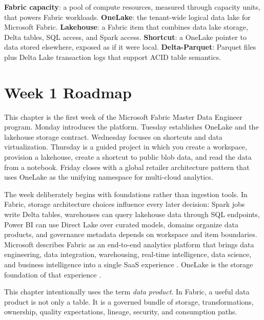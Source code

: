 \begin{keyterms}
\textbf{Fabric capacity}: a pool of compute resources, measured through capacity units, that powers Fabric workloads. \quad
\textbf{OneLake}: the tenant-wide logical data lake for Microsoft Fabric. \quad
\textbf{Lakehouse}: a Fabric item that combines data lake storage, Delta tables, SQL access, and Spark access. \quad
\textbf{Shortcut}: a OneLake pointer to data stored elsewhere, exposed as if it were local. \quad
\textbf{Delta-Parquet}: Parquet files plus Delta Lake transaction logs that support ACID table semantics.
\end{keyterms}

\section{Week 1 Roadmap}
This chapter is the first week of the Microsoft Fabric Master Data Engineer program. Monday introduces the platform. Tuesday establishes OneLake and the lakehouse storage contract. Wednesday focuses on shortcuts and data virtualization. Thursday is a guided project in which you create a workspace, provision a lakehouse, create a shortcut to public blob data, and read the data from a notebook. Friday closes with a global retailer architecture pattern that uses OneLake as the unifying namespace for multi-cloud analytics.

The week deliberately begins with foundations rather than ingestion tools. In Fabric, storage architecture choices influence every later decision: Spark jobs write Delta tables, warehouses can query lakehouse data through SQL endpoints, Power BI can use Direct Lake over curated models, domains organize data products, and governance metadata depends on workspace and item boundaries. Microsoft describes Fabric as an end-to-end analytics platform that brings data engineering, data integration, warehousing, real-time intelligence, data science, and business intelligence into a single SaaS experience \cite{microsoftFabricOverview}. OneLake is the storage foundation of that experience \cite{microsoftOneLakeOverview}.

\begin{notebox}
This chapter intentionally uses the term \emph{data product}. In Fabric, a useful data product is not only a table. It is a governed bundle of storage, transformations, ownership, quality expectations, lineage, security, and consumption paths.
\end{notebox}


